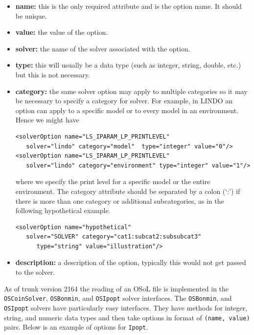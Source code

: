 \documentclass[11pt]{article}
\renewcommand{\_}{{\char"5F}}
\renewcommand{\{}{{\char"7B}}
\renewcommand{\}}{{\char"7D}}
\renewcommand{\^}{{\char"0D}}
\renewcommand{\'}{{\char"0D}}
\begin{document}
\begin{enumerate}[Step 1:]
\begin{itemize}

\item {\bf name:} this is the only required attribute and is the option name. It should be unique.

\item {\bf value:}  the value of the option.

\item {\bf solver:} the name of the solver associated with the option.

\item {\bf type:} this will usually be a data type (such as integer, string, double, etc.) but this is not necessary.

\item {\bf category:} the same solver option may apply to multiple categories so it may be necessary to specify a 
category for solver. For example, in LINDO an option can apply to a specific model or to every model in an environment. 
Hence we might have

\begin{verbatim}
<solverOption name="LS_IPARAM_LP_PRINTLEVEL" 
   solver="lindo" category="model"  type="integer" value="0"/>
<solverOption name="LS_IPARAM_LP_PRINTLEVEL" 
   solver="lindo" category="environment" type="integer" value="1"/>
\end{verbatim}
where we specify the print level for a specific model or the entire environment.   The category attribute should be 
separated by a colon (`:') if there is more than one  category or  additional subcategories, 
as in the following hypothetical example.
\begin{verbatim}
<solverOption name="hypothetical" 
   solver="SOLVER" category="cat1:subcat2:subsubcat3" 
      type="string" value="illustration"/>
\end{verbatim}

\item {\bf description:} a description of the option, typically this would not get passed to the solver.

\end{itemize}

As of trunk version 2164 the reading of an OSoL file is implemented in the {\tt OSCoinSolver}, 
{\tt OSBonmin}, and {\tt OSIpopt} solver interfaces.   The  {\tt OSBonmin}, and {\tt OSIpopt} solvers have 
particularly easy interfaces. 
They have methods for integer, string, and numeric data types and then take options in format of {\tt (name, value)} pairs.
Below is an example of options for {\tt Ipopt}.



\end{enumerate}
\end{document}
